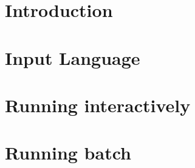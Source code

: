 \documentclass[a4paper,10pt]{report}
\begin{document}
\sloppypar




\tableofcontents

\chapter{Introduction}
\label{Introduction}


%

\chapter{Input Language}
\label{Input Language}


\chapter{Running \nusmvhead interactively}
\label{Running NuSMV interactively}


\chapter{Running \nusmvhead batch}
\label{Running NuSMV batch} 






\newpage
\appendix




\cleardoublepage

\printindex[com]
\printindex[var]
\printindex
\end{document}
